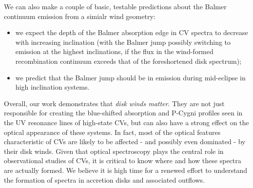 \documentclass[preprint, a4paper, 11pt]{aastex}
\begin{document}

We can also make a couple of basic,
testable predictions about the Balmer continuum emission
from a simialr wind geometry:
\begin{itemize}
	\item we expect the depth of the Balmer absorption edge in CV
          spectra to decrease with increasing inclination (with the
          Balmer jump possibly switching to emission at the highest
          inclinations, if the flux in the wind-formed recombination
          continuum exceeds that of the foreshortened disk spectrum);
	\item we predict that the Balmer jump should be in emission
          during mid-eclipse in high inclination systems.
\end{itemize}

\smallskip


Overall, our work demonstrates that {\sl disk winds matter}. They are
not just responsible for creating the blue-shifted absorption and
P-Cygni profiles seen in the UV resonance lines of high-state CVs, but
can also have a strong effect on the optical appearance of these
systems. In fact, most of the optical features characteristic of CVs
are likely to be affected - and possibly even dominated - by their disk
winds. Given that optical spectroscopy plays the central role in
observational studies of CVs, it is critical to know 
where and how these spectra are actually formed. We believe it is high
time for a renewed effort to understand the formation of spectra in
accretion disks and associated outflows. 


\end{document}

